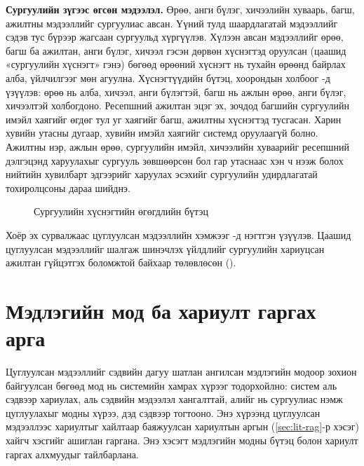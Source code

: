 \textbf{Сургуулийн зүгээс өгсөн мэдээлэл.} Өрөө, анги бүлэг, хичээлийн хуваарь, багш, ажилтны мэдээллийг сургуулиас авсан. Үүний тулд шаардлагатай мэдээллийг сэдэв тус бүрээр жагсаан сургуульд хүргүүлэв. Хүлээн авсан мэдээллийг өрөө, багш ба ажилтан, анги бүлэг, хичээл гэсэн дөрвөн хүснэгтэд оруулсан (цаашид «сургуулийн хүснэгт» гэнэ) бөгөөд өрөөний хүснэгт нь тухайн өрөөнд байрлах алба, үйлчилгээг мөн агуулна. Хүснэгтүүдийн бүтэц, хоорондын холбоог -д үзүүлэв: өрөө нь алба, хичээл, анги бүлэгтэй, багш нь ажлын өрөө, анги бүлэг, хичээлтэй холбогдоно. Ресепшний ажилтан эцэг эх, зочдод багшийн сургуулийн имэйл хаягийг өгдөг тул уг хаягийг багш, ажилтны хүснэгтэд тусгасан. Харин хувийн утасны дугаар, хувийн имэйл хаягийг системд оруулаагүй болно. Ажилтны нэр, ажлын өрөө, сургуулийн имэйл, хичээлийн хуваарийг ресепшний дэлгэцэнд харуулахыг сургууль зөвшөөрсөн бол гар утаснаас хэн ч нээж болох нийтийн хувилбарт эдгээрийг харуулах эсэхийг сургуулийн удирдлагатай тохиролцсоны дараа шийднэ.

\begin{figure}[ht]
\centering
{}
\caption{Сургуулийн хүснэгтийн өгөгдлийн бүтэц}
\label{fig:datamodel}
\end{figure}

Хоёр эх сурвалжаас цуглуулсан мэдээллийн хэмжээг -д нэгтгэн үзүүлэв. Цаашид цуглуулсан мэдээллийг шалгаж шинэчлэх үйлдлийг сургуулийн хариуцсан ажилтан гүйцэтгэх боломжтой байхаар төлөвлөсөн ().

\section{Мэдлэгийн мод ба хариулт гаргах арга}
\label{sec:rag-method}

Цуглуулсан мэдээллийг сэдвийн дагуу шатлан ангилсан мэдлэгийн модоор зохион байгуулсан бөгөөд мод нь системийн хамрах хүрээг тодорхойлно: систем аль сэдвээр хариулах, аль сэдвийн мэдээлэл хангалттай, алийг нь сургуулиас нэмж цуглуулахыг модны хүрээ, дэд сэдвээр тогтооно. Энэ хүрээнд цуглуулсан мэдээллээс хариултыг хайлтаар баяжуулсан хариултын аргын (\ref{sec:lit-rag}-р хэсэг) хайгч хэсгийг ашиглан гаргана. Энэ хэсэгт мэдлэгийн модны бүтэц болон хариулт гаргах алхмуудыг тайлбарлана.

